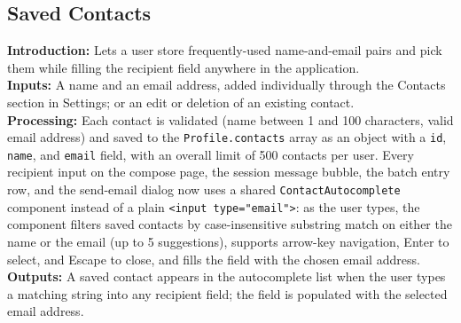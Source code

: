 \documentclass[12pt,a4paper]{article}
\begin{document}
\subsection{Saved Contacts}
\noindent\textbf{Introduction:} Lets a user store frequently-used name-and-email pairs and pick them while filling the recipient field anywhere in the application.\\
\noindent\textbf{Inputs:} A name and an email address, added individually through the Contacts section in Settings; or an edit or deletion of an existing contact.\\
\noindent\textbf{Processing:} Each contact is validated (name between 1 and 100 characters, valid email address) and saved to the \texttt{Profile.contacts} array as an object with a \texttt{id}, \texttt{name}, and \texttt{email} field, with an overall limit of 500 contacts per user. Every recipient input on the compose page, the session message bubble, the batch entry row, and the send-email dialog now uses a shared \texttt{ContactAutocomplete} component instead of a plain \texttt{<input type="email">}: as the user types, the component filters saved contacts by case-insensitive substring match on either the name or the email (up to 5 suggestions), supports arrow-key navigation, Enter to select, and Escape to close, and fills the field with the chosen email address.\\
\noindent\textbf{Outputs:} A saved contact appears in the autocomplete list when the user types a matching string into any recipient field; the field is populated with the selected email address.
\end{document}
